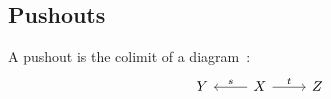 \subsection{Pushouts}

\begin{definition}[Pushout]\label{def:pushout}

  A pushout is the colimit of a
  diagram~\parencite[p.~130]{leinster:basic_category_theory}:
  \[\begin{tikzcd}[ampersand replacement=\&]
    Y \& X \& Z
    \arrow["t", from=1-2, to=1-3]
    \arrow["s"', from=1-2, to=1-1]
  \end{tikzcd}\]
\end{definition}